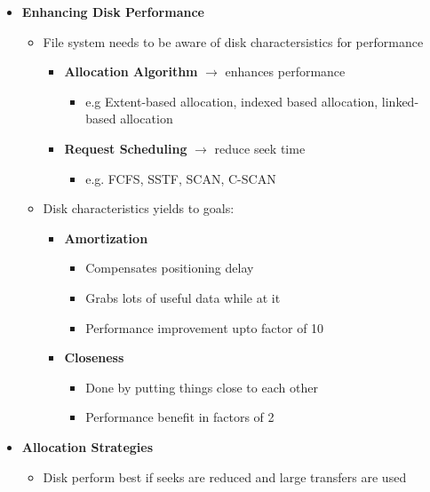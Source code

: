 \documentclass[12pt]{article}
\begin{document}
\begin{itemize}
    \item \textbf{Enhancing Disk Performance}
    \begin{itemize}
        \item File system needs to be aware of disk charactersistics for performance
        \begin{itemize}
            \item \textbf{Allocation Algorithm} $\to$ enhances performance
            \begin{itemize}
                \item e.g Extent-based allocation, indexed based allocation, linked-based allocation
            \end{itemize}
            \item \textbf{Request Scheduling} $\to$ reduce seek time
            \begin{itemize}
                \item e.g. FCFS, SSTF, SCAN, C-SCAN
            \end{itemize}
        \end{itemize}
        \item Disk characteristics yields to goals:
        \begin{itemize}
            \item \textbf{Amortization}
            \begin{itemize}
                \item Compensates positioning delay
                \item Grabs lots of useful data while at it
                \item Performance improvement upto factor of 10
            \end{itemize}
            \item \textbf{Closeness}
            \begin{itemize}
                \item Done by putting things close to each other
                \item Performance benefit in factors of 2
            \end{itemize}
        \end{itemize}
    \end{itemize}
    \item \textbf{Allocation Strategies}
    \begin{itemize}
        \item Disk perform best if seeks are reduced and large transfers are used

\end{itemize}
\end{itemize}
\end{document}
